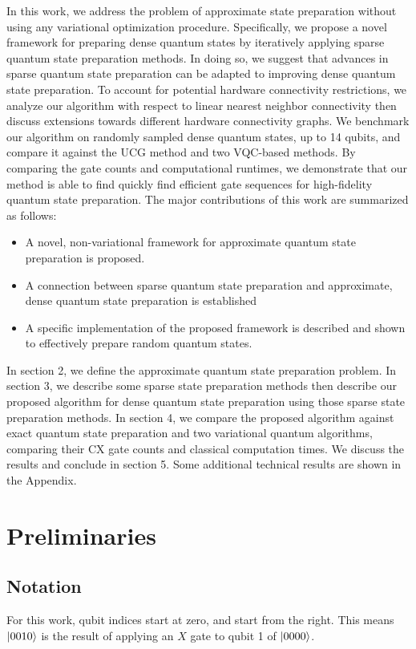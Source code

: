 \documentclass{article}
\begin{document}
In this work, we address the problem of approximate state preparation without
using any variational optimization procedure. Specifically, we propose a novel 
framework for preparing dense quantum states by iteratively applying sparse 
quantum state preparation methods. In doing so, we suggest that advances in 
sparse quantum state preparation can be adapted to improving dense quantum state
preparation. To account for potential hardware connectivity restrictions, we
analyze our algorithm with respect to linear nearest neighbor connectivity then
discuss extensions towards different hardware connectivity graphs. We benchmark
our algorithm on randomly sampled dense quantum states, up to 14 qubits, and
compare it against the UCG method and two VQC-based methods. By comparing the
gate counts and computational runtimes, we demonstrate that our method is able
to find quickly find efficient gate sequences for high-fidelity quantum state 
preparation. The major contributions of this work are summarized as follows:
\begin{itemize}
  \item A novel, non-variational framework for approximate quantum state 
    preparation is proposed.
  \item A connection between sparse quantum state preparation and approximate,
    dense quantum state preparation is established
  \item A specific implementation of the proposed framework is described and
    shown to effectively prepare random quantum states.
\end{itemize}

In section 2, we define the approximate quantum state preparation
problem. In section 3, we describe some sparse state preparation methods 
then describe our proposed algorithm for dense quantum state
preparation using those sparse state preparation methods. In section 4, we
compare the proposed algorithm against exact quantum state preparation and two
variational quantum algorithms, comparing their CX gate counts and classical
computation times. We discuss the results and conclude in section 5.
Some additional technical results are shown in the Appendix.

\section{Preliminaries}
\subsection{Notation}
For this work, qubit indices start at zero, and start from the right. This means
$\mathinner{|{0010}\rangle}$ is the result of applying an $X$ gate to qubit 1 of $\mathinner{|{0000}\rangle}$.
\end{document}
